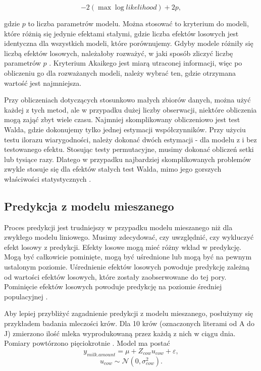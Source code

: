 \documentclass[12pt]{mwbk}
\theoremstyle{plain}
\theoremstyle{definition}
\theoremstyle{remark}
\begin{document}
\begin{enumerate}
	$$-2(\operatorname{max} \operatorname{log} likelihood)+ 2p,$$
	
	gdzie $p$ to liczba parametrów modelu. Można stosować to kryterium do modeli, które różnią się jedynie efektami stałymi, gdzie liczba efektów losowych jest identyczna dla wszystkich modeli, które porównujemy. Gdyby modele różniły się liczbą efektów losowych, należałoby rozważyć, w jaki sposób zliczyć liczbę parametrów $p$ \cite{faraway}. Kryterium Akaikego jest miarą utraconej informacji, więc po obliczeniu go dla rozważanych modeli, należy wybrać ten, gdzie otrzymana wartość jest najmniejsza.

\end{enumerate}

Przy obliczeniach dotyczących stosunkowo małych zbiorów danych, można użyć każdej z tych metod, ale w przypadku dużej liczby obserwacji, niektóre obliczenia mogą zająć zbyt wiele czasu. Najmniej skomplikowany obliczeniowo jest test Walda, gdzie dokonujemy tylko jednej estymacji współczynników. Przy użyciu testu ilorazu wiarygodności, należy dokonać dwóch estymacji - dla modelu z i bez testowanego efektu. Stosując testy permutacyjne, musimy dokonać obliczeń setki lub tysiące razy. Dlatego w przypadku najbardziej skomplikowanych problemów zwykle stosuje się dla efektów stałych test Walda, mimo jego gorszych właściwości statystycznych \cite{biecek}.





\subsection{Predykcja z modelu mieszanego}
Proces predykcji jest trudniejszy w przypadku modelu mieszanego niż dla zwykłego modelu liniowego. Musimy zdecydować, czy uwzględnić, czy wykluczyć efekt losowy z predykcji. Efekty losowe mogą mieć różny wkład w predykcję. Mogą być całkowicie pominięte, mogą być uśrednione lub mogą być na pewnym ustalonym poziomie. Uśrednienie efektów losowych powoduje predykcję zależną od wartości efektów losowych, które zostały zaobserwowane do tej pory. Pominięcie efektów losowych powoduje predykcję na poziomie średniej populacyjnej
 \cite{prediction}.
 
 Aby lepiej przybliżyć zagadnienie predykcji z modelu mieszanego, posłużymy się przykładem badania mleczości krów. Dla 10 krów (oznaczonych literami od A do J) zmierzono ilość mleka wyprodukowaną przez każdą z nich w ciągu dnia. Pomiary powtórzono pięciokrotnie \cite{biecek}.
Model ma postać 
$$y_{milk.amount}=\mu+Z_{cow}u_{cow}+\varepsilon,$$
$$u_{cow} \sim \mathcal{N}(0, \sigma^2_{cow}).$$
\end{document}
